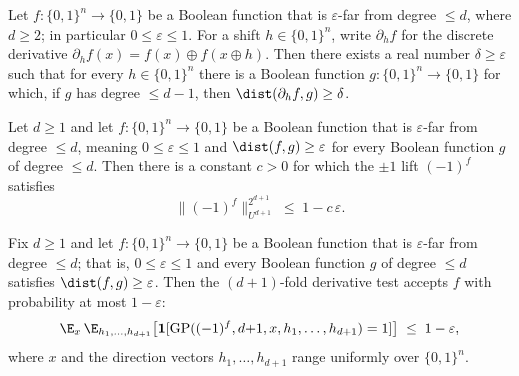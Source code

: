 \begin{lemma}
\label{LowDegreeTest.derivative_distance_lemma}
\leanok
{}
Let $f : \{0,1\}^n \to \{0,1\}$ be a Boolean function that is $\varepsilon$-far from
degree $\le d$, where $d \ge 2$; in particular $0 \le \varepsilon \le 1$. For a shift $h
\in \{0,1\}^n$, write $\partial_h f$ for the discrete derivative $\partial_h f(x) = f(x)
\oplus f(x \oplus h)$. Then there exists a real number $\delta \ge \varepsilon$ such
that for every $h \in \{0,1\}^n$ there is a Boolean function $g : \{0,1\}^n \to \{0,1\}$
for which, if $g$ has degree $\le d-1$, then $\dist(\partial_h f, g) \ge \delta$.
\end{lemma}

\begin{lemma}
\label{LowDegreeTest.gowers_norm_le_of_far}
\leanok
{}
Let $d \ge 1$ and let $f : \{0,1\}^n \to \{0,1\}$ be a Boolean function that is
$\varepsilon$-far from degree $\le d$, meaning $0 \le \varepsilon \le 1$ and $\dist(f,
g) \ge \varepsilon$ for every Boolean function $g$ of degree $\le d$. Then there is a
constant $c > 0$ for which the $\pm 1$ lift $(-1)^{f}$ satisfies
\[
  \bigl\|(-1)^{f}\bigr\|_{U^{d+1}}^{2^{d+1}} \;\le\; 1 - c\,\varepsilon.
\]
\end{lemma}

\begin{lemma}
\label{LowDegreeTest.degree_test_quantitative_soundness}
\leanok
{}
Fix $d \ge 1$ and let $f : \{0,1\}^n \to \{0,1\}$ be a Boolean function that is
$\varepsilon$-far from degree $\le d$; that is, $0 \le \varepsilon \le 1$ and every
Boolean function $g$ of degree $\le d$ satisfies $\dist(f,g) \ge \varepsilon$. Then the
$(d{+}1)$-fold derivative test accepts $f$ with probability at most $1 - \varepsilon$:
\[
  \E_{x}\,\E_{h_1,\ldots,h_{d+1}}
  \bigl[\mathbf{1}[\mathrm{GP}((-1)^f, d{+}1, x, h_1,\ldots,h_{d+1}) = 1]\bigr]
  \;\le\; 1 - \varepsilon,
\]
where $x$ and the direction vectors $h_1,\ldots,h_{d+1}$ range uniformly over
$\{0,1\}^n$.
\end{lemma}

